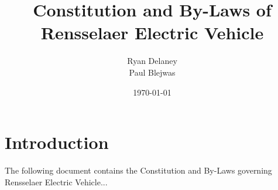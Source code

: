 \documentclass[date, maintoc, notoc]{combine}
\title{Constitution and By-Laws of Rensselaer Electric Vehicle}
\author{Ryan Delaney \\ Paul Blejwas}
\date{\today}
\begin{document}
\pagestyle{combine}
\maketitle
\newpage
\tableofcontents
\clearpage

\section{Introduction}
\label{intro}

The following document contains the Constitution and By-Laws governing Rensselaer Electric Vehicle...

\begin{papers}


\end{papers}
\clearpage
\end{document}
